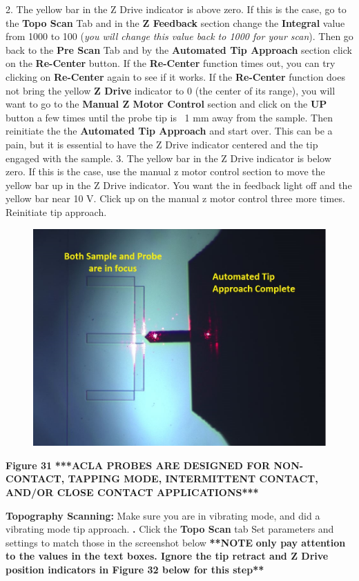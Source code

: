 \documentclass{../lab}
\begin{document}
2. The yellow bar in the Z Drive indicator is above zero. If this is the case, go to the \textbf{Topo Scan }Tab and in the \textbf{Z Feedback }section change the \textbf{Integral }value from 1000 to 100 (\emph{you will change this value back to 1000 for your scan}).  Then go back to the \textbf{Pre Scan }Tab and by the \textbf{Automated Tip Approach }section click on the \textbf{Re-Center} button.  If the \textbf{Re-Center }function times out, you can try clicking on \textbf{Re-Center }again to see if it works.  If the \textbf{Re-Center }function does not bring the yellow \textbf{Z Drive }indicator to 0 (the center of its range), you will want to go to the \textbf{Manual Z Motor Control }section and click on the \textbf{UP }button a few times until the probe tip is ~1 mm away from the sample.  Then reinitiate the the \textbf{Automated Tip Approach} and start over. This can be a pain, but it is essential to have the Z Drive indicator centered and the tip engaged with the sample.
3. The yellow bar in the Z Drive indicator is below zero. If this is the case, use the manual z motor control section to move the yellow bar up in the Z Drive indicator. You want the in feedback light off and the yellow bar near 10 V. Click up on the manual z motor control three more times. Reinitiate tip approach.



\begin{figure}[h]
    \centering
    \href{http://dev-physicsadv.pantheon.berkeley.edu/sites/default/files/AFMImages/bothfocused.jpg}{\includegraphics[width=0.5\linewidth]{images/bothfocused.jpg}}
    \caption{}
    \label{fig:bothfocused}
\end{figure}


\textbf{Figure 31}
\textbf{***ACLA PROBES ARE DESIGNED FOR NON-CONTACT, TAPPING MODE, INTERMITTENT CONTACT, AND/OR CLOSE CONTACT APPLICATIONS***}
\textbf{}



\textbf{Topography Scanning:}
Make sure you are in vibrating mode, and did a vibrating mode tip approach. \textbf{.}
Click the \textbf{Topo Scan } tab
Set parameters and settings to match those in the screenshot below
\textbf{**NOTE} \textbf{only pay attention to the values in the text boxes.  Ignore the tip retract and Z Drive position indicators in Figure 32 below for this step**}
\end{document}
